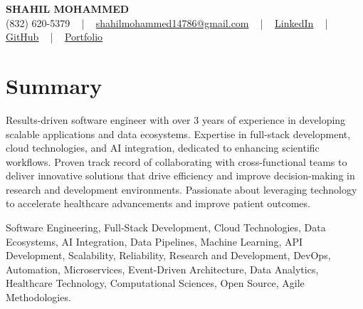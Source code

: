 \documentclass[letterpaper,10pt]{article}
\begin{document}
\begin{center}
    {\fontsize{14pt}{12pt}\selectfont \textbf{\MakeUppercase{Shahil Mohammed}}}\\ \vspace{2pt}
    \fontsize{10pt}{12pt}\selectfont (832) 620-5379 ~ | ~ \href{mailto:shahilmohammed14786@gmail.com}{shahilmohammed14786@gmail.com} ~ | ~  
    \href{https://www.linkedin.com/in/shahil-mohammed-9652931a1/}{\color{blue}\underline{LinkedIn}}  ~ | ~ 
    \href{https://github.com/freakbeast14}{\color{blue}\underline{GitHub}} ~ | ~ 
    \href{https://shahil-mohammed.netlify.app/}{\color{blue}\underline{Portfolio}}
    \vspace{-8pt}
\end{center}

\section{Summary}
\vspace{-2pt}\fontsize{8pt}{9pt}\selectfont
Results-driven software engineer with over 3 years of experience in developing scalable applications and data ecosystems. Expertise in full-stack development, cloud technologies, and AI integration, dedicated to enhancing scientific workflows. Proven track record of collaborating with cross-functional teams to deliver innovative solutions that drive efficiency and improve decision-making in research and development environments. Passionate about leveraging technology to accelerate healthcare advancements and improve patient outcomes.
 \vspace{-5pt}
 
{\fontsize{1pt}{1pt}\selectfont\color{white}
Software Engineering, Full-Stack Development, Cloud Technologies, Data Ecosystems, AI Integration, Data Pipelines, Machine Learning, API Development, Scalability, Reliability, Research and Development, DevOps, Automation, Microservices, Event-Driven Architecture, Data Analytics, Healthcare Technology, Computational Sciences, Open Source, Agile Methodologies.
}
\vspace{-8pt}

\vspace{-2pt}
\end{document}
